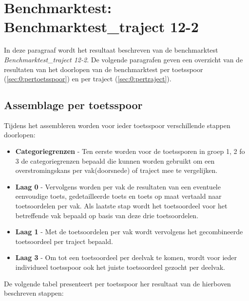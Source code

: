 \section{Benchmarktest: Benchmarktest\_traject 12-2}
	\label{ch:benchmarktTest0}
In deze paragraaf wordt het resultaat beschreven van de benchmarktest \textit{Benchmarktest\_traject 12-2}. De volgende paragrafen geven een overzicht van de resultaten van het doorlopen van de benchmarktest per toetsspoor (\autoref{sec:0:pertoetsspoor}) en per traject (\autoref{sec:0:pertraject}).

\subsection{Assemblage per toetsspoor}
	\label{sec:0:pertoetsspoor}
Tijdens het assembleren worden voor ieder toetsspoor verschillende stappen doorlopen:
\begin{itemize}
	\item \textbf{Categoriegrenzen} - Ten eerste worden voor de toetssporen in groep 1, 2 fo 3 de categoriegrenzen bepaald die kunnen worden gebruikt om een overstromingskans per vak(doorsnede) of traject mee te vergelijken.
	\item \textbf{Laag 0} - Vervolgens worden per vak de resultaten van een eventuele eenvoudige toets, gedetailleerde toets en toets op maat vertaald naar toetsoordelen per vak. Als laatste stap wordt het toetsoordeel voor het betreffende vak bepaald op basis van deze drie toetsoordelen.
	\item \textbf{Laag 1} - Met de toetsoordelen per vak wordt vervolgens het gecombineerde toetsoordeel per traject bepaald.
	\item \textbf{Laag 3} - Om tot een toetsoordeel per deelvak te komen, wordt voor ieder individueel toetsspoor ook het juiste toetsoordeel gezocht per deelvak.
\end{itemize}

De volgende tabel presenteert per toetsspoor her resultaat van de hierboven beschreven stappen:

